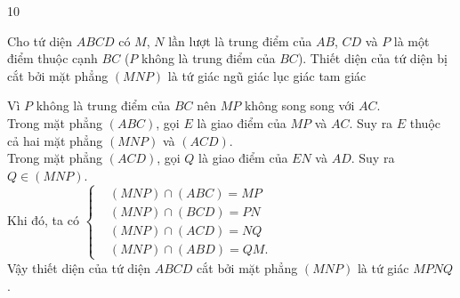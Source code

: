\begin{indapan}{10}
\begin{ex}%
Cho tứ diện $ABCD$ có $M$, $N$ lần lượt là trung điểm của $AB$, $CD$ và $P$ là một điểm thuộc cạnh $BC$ ($P$ không là trung điểm của $BC$). Thiết diện của tứ diện bị cắt bởi mặt phẳng $(MNP)$ là
\choice
{\True tứ giác}
{ngũ giác}
{lục giác}
{tam giác}
\loigiai
{
\immini
{
Vì $P$ không là trung điểm của $BC$ nên $MP$ không song song với $AC$.\\
Trong mặt phẳng $(ABC)$, gọi $E$ là giao điểm của $MP$ và $AC$. Suy ra $E$ thuộc cả hai mặt phẳng $(MNP)$ và $(ACD)$.\\
Trong mặt phẳng $(ACD)$, gọi $Q$ là giao điểm của $EN$ và $AD$. Suy ra $Q\in (MNP)$.\\
Khi đó, ta có $\left\{\begin{aligned}&(MNP)\cap (ABC)=MP \\&(MNP)\cap (BCD)=PN \\&(MNP)\cap (ACD)=NQ \\&(MNP)\cap (ABD)=QM.\end{aligned}\right.$\\
Vậy thiết diện của tứ diện $ABCD$ cắt bởi mặt phẳng $(MNP)$ là tứ giác $MPNQ$.
}
{
}
}
\end{ex}


\end{indapan}
